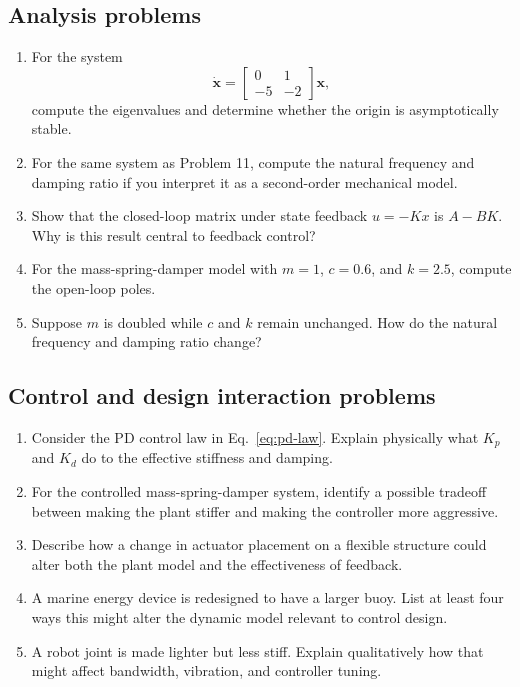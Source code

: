 \documentclass[11pt]{article}
\newcommand{\vect}[1]{\boldsymbol{#1}}
\newcommand{\state}{\vect{x}}
\begin{document}
\subsection*{Analysis problems}
\begin{enumerate}[leftmargin=1.5em,label=\textbf{P\arabic*.},resume]
  \item For the system
  \begin{equation*}
  \dot{\state}=\begin{bmatrix}0 & 1\\-5 & -2\end{bmatrix}\state,
  \end{equation*}
  compute the eigenvalues and determine whether the origin is asymptotically stable.
  \item For the same system as Problem 11, compute the natural frequency and damping ratio if you interpret it as a second-order mechanical model.
  \item Show that the closed-loop matrix under state feedback $u=-Kx$ is $A-BK$. Why is this result central to feedback control?
  \item For the mass-spring-damper model with $m=1$, $c=0.6$, and $k=2.5$, compute the open-loop poles.
  \item Suppose $m$ is doubled while $c$ and $k$ remain unchanged. How do the natural frequency and damping ratio change?
\end{enumerate}

\subsection*{Control and design interaction problems}
\begin{enumerate}[leftmargin=1.5em,label=\textbf{P\arabic*.},resume]
  \item Consider the PD control law in Eq.~\eqref{eq:pd-law}. Explain physically what $K_p$ and $K_d$ do to the effective stiffness and damping.
  \item For the controlled mass-spring-damper system, identify a possible tradeoff between making the plant stiffer and making the controller more aggressive.
  \item Describe how a change in actuator placement on a flexible structure could alter both the plant model and the effectiveness of feedback.
  \item A marine energy device is redesigned to have a larger buoy. List at least four ways this might alter the dynamic model relevant to control design.
  \item A robot joint is made lighter but less stiff. Explain qualitatively how that might affect bandwidth, vibration, and controller tuning.
\end{enumerate}
\end{document}
